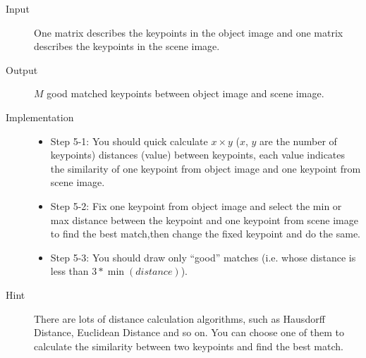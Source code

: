 \documentclass[12pt]{article}
\begin{document}
\begin{description}
\item[Input] One matrix describes the keypoints in the object image and one matrix describes the keypoints in the scene image.
\item[Output] $M$ good matched keypoints between object image and scene image.
\item[Implementation] \mbox{}
\begin{itemize}
\item Step 5-1: You should quick calculate $x \times y$ ($x$, $y$ are the number of keypoints) distances (value) between keypoints, each value indicates the similarity of one keypoint from object image and one keypoint from scene image.
\item Step 5-2: Fix one keypoint from object image and select the min or max distance between the keypoint and one keypoint from scene image to find the best match,then change the fixed keypoint and do the same.
\item Step 5-3: You should draw only ``good'' matches (i.e. whose distance is less than $3*\min(distance)$).
\end{itemize}   
\item[Hint] There are lots of distance calculation algorithms, such as Hausdorff Distance, Euclidean Distance and so on. You can choose one of them to calculate the similarity between two keypoints and find the best match.
\begin{figure}[!ht]
  \centering 
  \subfigure[]{ 
    \label{fig: result: b} %
}
\end{figure}
\end{description}
\end{document}
